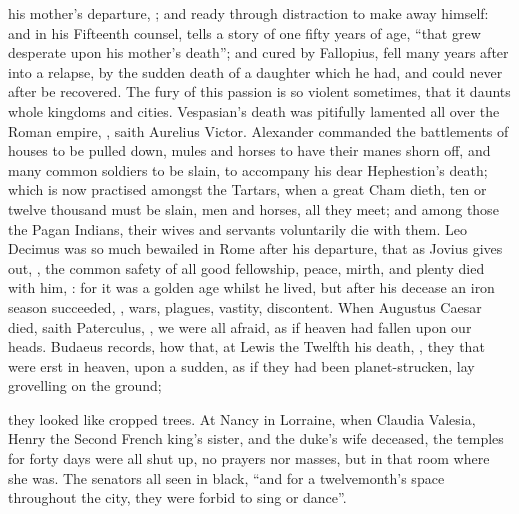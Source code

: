 his mother's departure, ; and ready through distraction to make away himself: and in his
Fifteenth counsel, tells a story of one fifty years of age, \enquote{that grew
desperate upon his mother's death}; and cured by Fallopius, fell many years
after into a relapse, by the sudden death of a daughter which he had, and could
never after be recovered. The fury of this passion is so violent sometimes,
that it daunts whole kingdoms and cities. Vespasian's death was pitifully
lamented all over the Roman empire, , saith Aurelius
Victor. Alexander commanded the battlements of houses to be pulled down, mules
and horses to have their manes shorn off, and many common soldiers to be slain,
to accompany his dear Hephestion's death; which is now practised amongst the
Tartars, when a great Cham dieth, ten or twelve thousand
must be slain, men and horses, all they meet; and among those the
Pagan Indians, their wives and servants voluntarily die
with them. Leo Decimus was so much bewailed in Rome after his departure, that
as Jovius gives out, , the common safety of all good fellowship, peace, mirth, and plenty
died with him, : for
it was a golden age whilst he lived, but after his decease
an iron season succeeded, , wars, plagues, vastity, discontent. When Augustus Caesar
died, saith Paterculus, , we were all afraid, as if
heaven had fallen upon our heads. Budaeus records, how
that, at Lewis the Twelfth his death, , they that were erst in heaven, upon a sudden, as if they had been
planet-strucken, lay grovelling on the ground;

they looked like cropped trees. At Nancy in Lorraine, when
Claudia Valesia, Henry the Second French king's sister, and the duke's wife
deceased, the temples for forty days were all shut up, no prayers nor masses,
but in that room where she was. The senators all seen in black, \enquote{and for a
twelvemonth's space throughout the city, they were forbid to sing or dance}.


